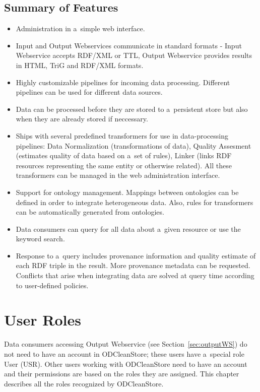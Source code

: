\section{Summary of Features}

\begin{itemize}
  \item Administration in a~simple web interface.
  \item Input and Output Webservices communicate in standard formats - Input Webservice accepts RDF/XML or TTL, Output Webservice provides results in HTML, TriG and RDF/XML formats.
  \item Highly customizable pipelines for incoming data processing. Different pipelines can be used for different data sources.
  \item Data can be processed before they are stored to a~persistent store but also when they are already stored if neccessary.
  \item Ships with several predefined transformers for use in data-processing pipelines: Data Normalization (transformations of data), Quality Assesment (estimates quality of data based on a~set of rules), Linker (links RDF resources representing the same entity or otherwise related). All these transformers can be managed in the web administration interface.
  \item Support for ontology management. Mappings between ontologies can be defined in order to integrate heterogeneous data. Also, rules for  transformers can be automatically generated from ontologies.
  \item Data consumers can query for all data about a~given resource or use the keyword search.
  \item Response to a~query includes provenance information and quality estimate of each RDF triple in the result. More provenance metadata can be requested. Conflicts that arise when integrating data are solved at query time according to user-defined policies. 
\end{itemize}



\chapter{User Roles}
\label{chap:userRoles}

Data consumers accessing Output Webservice (see Section~\ref{sec:outputWS}) do not need to have an account in ODCleanStore; these users have a~special role User (USR). Other users working with ODCleanStore need to have an account and their permissions are based on the roles they are assigned. This chapter describes all the roles recognized by ODCleanStore.

